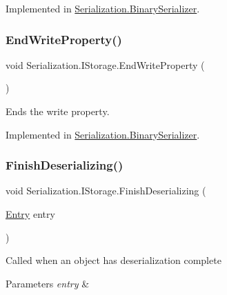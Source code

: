 Implemented in \hyperlink{class_serialization_1_1_binary_serializer_af242d8344e351d53f4cb1dca1f0d321c}{Serialization.\+Binary\+Serializer}.

\mbox{\label{interface_serialization_1_1_i_storage_a978b5e23e42f8db83095b9dfd1102528}} 
\subsubsection{\texorpdfstring{End\+Write\+Property()}{EndWriteProperty()}}
{\footnotesize\ttfamily void Serialization.\+I\+Storage.\+End\+Write\+Property (\begin{DoxyParamCaption}{ }\end{DoxyParamCaption})}



Ends the write property. 



Implemented in \hyperlink{class_serialization_1_1_binary_serializer_a481fce2c7372e97a46ab15316c33a395}{Serialization.\+Binary\+Serializer}.

\mbox{\label{interface_serialization_1_1_i_storage_a8377dea6764882fb9882d0bd92e03de6}} 
\subsubsection{\texorpdfstring{Finish\+Deserializing()}{FinishDeserializing()}}
{\footnotesize\ttfamily void Serialization.\+I\+Storage.\+Finish\+Deserializing (\begin{DoxyParamCaption}\item[{\hyperlink{class_serialization_1_1_entry}{Entry}}]{entry }\end{DoxyParamCaption})}



Called when an object has deserialization complete 


\begin{DoxyParams}{Parameters}
{\em entry} & \\
\hline
\end{DoxyParams}


